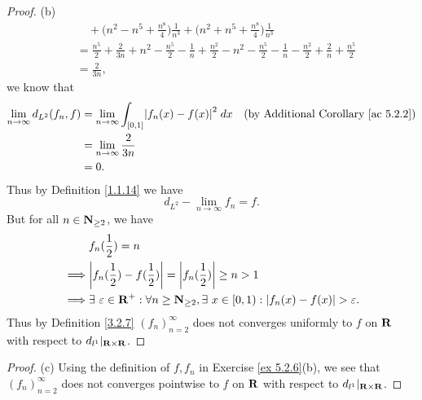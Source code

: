 \begin{proof}{(b)}
\begin{align*}
         & \quad + \bigg(n^2 - n^5 + \frac{n^8}{4}\bigg) \frac{1}{n^3} + \bigg(n^2 + n^5 + \frac{n^8}{4}\bigg) \frac{1}{n^3}                                                                                                                                                                                 \\
         & = \frac{n^5}{2} + \frac{2}{3n} + n^2 - \frac{n^5}{2} - \frac{1}{n} + \frac{n^2}{2} - n^2 - \frac{n^5}{2} - \frac{1}{n} - \frac{n^2}{2} + \frac{2}{n} + \frac{n^5}{2}                                                                                                                              \\
         & = \frac{2}{3n},
    \end{align*}
    we know that
    \begin{align*}
        \lim_{n \to \infty} d_{L^2}(f_n, f) & = \lim_{n \to \infty} \int_{[0, 1]} \abs{f_n(x) - f(x)}^2 \; dx & \text{(by Additional Corollary \ref{ac 5.2.2})} \\
                                            & = \lim_{n \to \infty} \frac{2}{3n}                                                                                \\
                                            & = 0.
    \end{align*}
    Thus by Definition \ref{1.1.14} we have
    \[
        d_{L^2} - \lim_{n \to \infty} f_n = f.
    \]
    But for all \(n \in \mathbf{N}_{\geq 2}\), we have
    \begin{align*}
                 & f_n(\frac{1}{2}) = n                                                                                                   \\
        \implies & \abs{f_n(\frac{1}{2}) - f(\frac{1}{2})} = \abs{f_n(\frac{1}{2})} \geq n > 1                                            \\
        \implies & \exists\ \varepsilon \in \R^+ : \forall n \geq \N_{\geq 2}, \exists\ x \in [0, 1) : \abs{f_n(x) - f(x)} > \varepsilon.
    \end{align*}
    Thus by Definition \ref{3.2.7} \((f_n)_{n = 2}^\infty\) does not converges uniformly to \(f\) on \(\mathbf{R}\) with respect to \(d_{l^1}|_{\mathbf{R} \times \mathbf{R}}\).
\end{proof}

\begin{proof}{(c)}
    Using the definition of \(f, f_n\) in Exercise \ref{ex 5.2.6}(b), we see that \((f_n)_{n = 2}^\infty\) does not converges pointwise to \(f\) on \(\mathbf{R}\) with respect to \(d_{l^1}|_{\mathbf{R} \times \mathbf{R}}\).
\end{proof}

